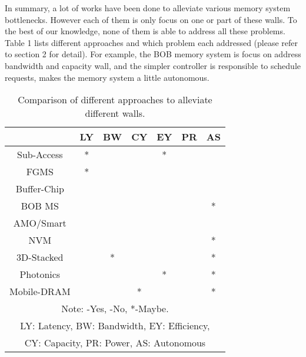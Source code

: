 \documentclass[pageno]{jpaper}
\begin{document}
In summary, a lot of works have been done to alleviate various memory system bottlenecks. However each of them is only focus on one or part of these walls. To the best of our knowledge, none of them is able to address all these problems. Table 1 lists different approaches and which problem each addressed (please refer to section 2 for detail). For example, the BOB \cite{BOBMemory} memory system is focus on address bandwidth and capacity wall, and the simpler controller is responsible to schedule requests, makes the memory system a little autonomous.

\begin{table}[h!]
  \centering
  \begin{tabular}{|c|c|c|c|c|c|c|}
    \hline
    \textbf{} & \textbf{LY} & \textbf{BW} & \textbf{CY} & \textbf{EY} & \textbf{PR} & \textbf{AS}\\
    \hline
    \hline
Sub-Access & * &  &  & * &  & \\
    \hline
    FGMS & * &  &  &  &  & \\
    \hline
    Buffer-Chip &  &  &  &  &  & \\
    \hline
    BOB MS &  &  &  &  &  & *\\
    \hline
    AMO/Smart &  &  &  &  &  & \\
    \hline
    NVM &  &  &  &  &  & *\\
    \hline
    3D-Stacked &  & * &  &  &  & *\\
    \hline
    Photonics &  &  &  & * &  & *\\
    \hline
    Mobile-DRAM &  &  & * &  &  & *\\
    \hline
    \hline
    \multicolumn{7}{|c|}{Note: -Yes, -No, *-Maybe.} \\
\multicolumn{7}{|c|}{ LY: Latency, BW: Bandwidth, EY: Efficiency,} \\
\multicolumn{7}{|c|}{CY: Capacity, PR: Power, AS: Autonomous} \\
    \hline
\end{tabular}
\caption{Comparison of different approaches to alleviate different walls. }
  \label{table:formatting}
\end{table}
\end{document}
